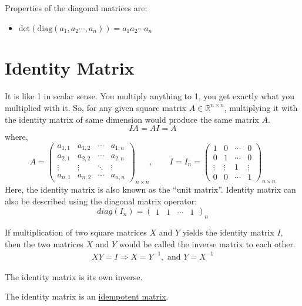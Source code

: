 \documentclass[conference,final,11pt,technote,onecolumn]{IEEEtran}\usepackage[]{graphicx}\usepackage[]{color}
\begin{document}
Properties of the diagonal matrices are:
\begin{itemize}
\item $\text{det}(\text{diag}(a_1, a_2\cdots, a_n)) = a_1a_2\cdots a_n$
\end{itemize}
	
	\section{Identity Matrix}
	\label{term:identity_matrix}
It is like 1 in scalar sense. You multiply anything to 1, you get exactly what you multiplied with it. So, for any given square matrix $A\in\mathbb{R}^{n\times n}$, multiplying it with the identity matrix of same dimension would produce the same matrix $A$.
\begin{equation}
IA = AI = A
\end{equation}
where,
\[ 
A =
 \begin{pmatrix}
  a_{1,1} & a_{1,2} & \cdots & a_{1,n} \\
  a_{2,1} & a_{2,2} & \cdots & a_{2,n} \\
  \vdots  & \vdots  & \ddots & \vdots  \\
  a_{n,1} & a_{n,2} & \cdots & a_{n,n}
 \end{pmatrix}_{n\times n}, \qquad I = I_n = 
 \begin{pmatrix}
 	1 & 0 & \cdots & 0 \\
 	0 & 1 & \cdots & 0 \\
 	\vdots & \vdots & 1 & \vdots \\
 	0 & 0 & \cdots & 1
 \end{pmatrix}_{n\times n}
\]
Here, the identity matrix is also known as the ``unit matrix''\cite{akivis2012introduction}.
Identity matrix can also be described using the diagonal matrix operator:
\[
diag(I_n) = \begin{pmatrix}
			1 & 1 & \cdots & 1
			\end{pmatrix}_{n}
\]

If multiplication of two square matrices $X$ and $Y$ yields the identity matrix $I$, then the two matrices $X$ and $Y$ would be called the inverse matrix to each other.
\begin{eqnarray}
\nonumber X Y = I \Rightarrow X = Y^{-1}, \text{ and } Y = X^{-1}
\end{eqnarray}

The identity matrix is its own inverse.

The identity matrix is an \hyperref[term:idempotent_matrix]{idempotent matrix}.
\end{document}
